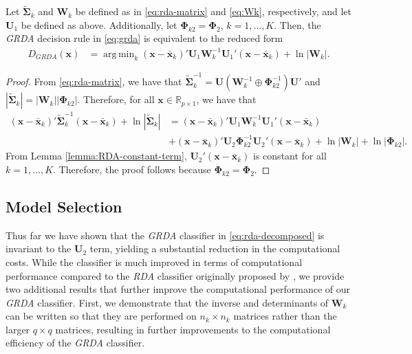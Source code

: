\documentclass[11pt]{article}
\newcommand{\xbar}{\bar{\bm x}}
\DeclareMathOperator*{\argmin}{arg\,min}
\begin{document}
\begin{thm}
Let $\tilde{\bm \Sigma}_k$ and $\bm W_k$ be defined as in \eqref{eq:rda-matrix} and \eqref{eq:Wk}, respectively, and let $\bm U_1$ be defined as above. Additionally, let $\bm \Phi_{k2} = \bm \Phi_2$, $k = 1, \ldots, K$. Then, the \emph{GRDA} decision rule in \eqref{eq:grda} is equivalent to the reduced form
	\begin{align}
		D_{GRDA}(\bm x) &= \argmin_k  (\bm x - \xbar_k)' \bm U_1 \bm W_k^{-1} \bm U_1' (\bm x - \xbar_k) + \ln | \bm W_k |. \label{eq:rda-decomposed}
	\end{align}
	
\end{thm}
\begin{proof}
	From \eqref{eq:rda-matrix}, we have that $\tilde{\bm \Sigma}_k^{-1} = \bm U(\bm W_k^{-1} \oplus\bm \Phi_{k2}^{-1})\bm U'$ and $|\tilde{\bm \Sigma}_k| = | \bm W_k | |\bm \Phi_{k2}|$. Therefore, for all $\bm x \in \mathbb{R}_{p \times 1}$, we have that
	\begin{align*}
	(\bm x - \xbar_k)' \tilde{\bm\Sigma}_k^{-1}(\bm x - \xbar_k)  + \ln |\tilde{\bm\Sigma}_k| &= (\bm x - \xbar_k)' \bm U_1 \bm W_k^{-1} \bm U_1' (\bm x - \xbar_k)\\
	&+ (\bm x - \xbar_k)' \bm U_2 \bm \Phi_{k2}^{-1} \bm U_2' (\bm x - \xbar_k) + \ln | \bm W_k | + \ln |\bm \Phi_{k2}|.
	\end{align*}
From Lemma \ref{lemma:RDA-constant-term}, $\bm U_2' (\bm x - \xbar_k)$ is constant for all $k = 1, \ldots, K$. Therefore, the proof follows because $\bm \Phi_{k2} = \bm \Phi_2$.
\end{proof}

\subsection{Model Selection}

Thus far we have shown that the \emph{GRDA} classifier in \eqref{eq:rda-decomposed} is invariant to the $\bm U_2$ term, yielding a substantial reduction in the computational costs. While the classifier is much improved in terms of computational performance compared to the \emph{RDA} classifier originally proposed by \cite{Friedman:1989tm}, we provide two additional results that further improve the computational performance of our \emph{GRDA} classifier. First, we demonstrate that the inverse and determinants of $\bm W_k$ can be written so that they are performed on $n_k \times n_k$ matrices rather than the larger $q \times q$ matrices, resulting in further improvements to the computational efficiency of the \emph{GRDA} classifier.
\end{document}
